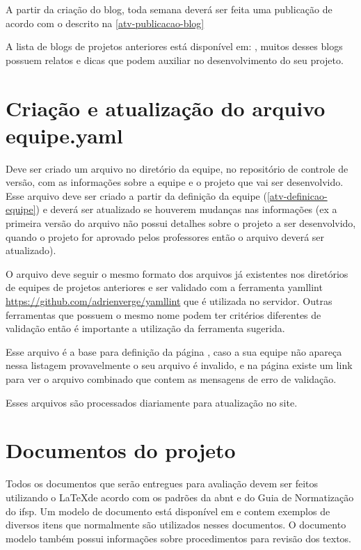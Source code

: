 A partir da criação do blog, toda semana deverá ser feita uma publicação de acordo com o descrito na \autoref{atv-publicacao-blog}

A lista de blogs de projetos anteriores está disponível em: , muitos desses blogs possuem relatos e dicas que podem auxiliar no desenvolvimento do seu projeto.


\section{Criação e atualização do arquivo equipe.yaml}\label{atv-equipe-yaml}
Deve ser criado um arquivo no diretório da equipe, no repositório de controle de versão, com as informações sobre a equipe e o projeto que vai ser desenvolvido. Esse arquivo deve ser criado a partir da definição da equipe (\autoref{atv-definicao-equipe}) e deverá ser atualizado se houverem mudanças nas informações (ex a primeira versão do arquivo não possui detalhes sobre o projeto a ser desenvolvido, quando o projeto for aprovado pelos professores então o arquivo deverá ser atualizado).

O arquivo deve seguir o mesmo formato dos arquivos já existentes nos diretórios de equipes de projetos anteriores e ser validado com a ferramenta yamllint \url{https://github.com/adrienverge/yamllint} que é utilizada no servidor. Outras ferramentas que possuem o mesmo nome podem ter critérios diferentes de validação então é importante a utilização da ferramenta sugerida.

Esse arquivo é a base para definição da página , caso a sua equipe não apareça nessa listagem provavelmente o seu arquivo é invalido, e na página existe um link para ver o arquivo combinado que contem as mensagens de erro de validação.

Esses arquivos são processados diariamente para atualização no site.






\section{Documentos do projeto}\label{documentos-latex}

Todos os documentos que serão entregues para avaliação devem ser feitos utilizando o \LaTeX \space de acordo com os padrões da \ac{abnt} e do Guia de Normatização do \ac{ifsp}. Um modelo de documento está disponível em \urlmodelo \space e contem exemplos de diversos itens que normalmente são utilizados nesses documentos. O documento modelo também possui informações sobre procedimentos para revisão dos textos.


